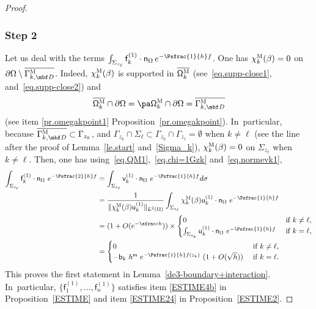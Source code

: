 \begin{proof}
\subsubsection*{Step 2} Let us deal with the terms $ \int_{\Sigma_{z_\ell}} \mathsf f_k^{(1)} \cdot \mathsf n_\Omega \, e^{- \Psfrac{1}{h} f} $.
One has
$\chi_k^{\textsc{M}} (\beta)=0$ on $\partial \Omega\setminus \overline{\Gamma_{k,\mbf D}^{ \textsc{M} }}$.
Indeed, $\chi_k^{\textsc{M}} (\beta)$ is supported in $\overline{\mathsf \Omega_k^{\textsc{M}}}$ (see~\eqref{eq.supp-close1}, and~\eqref{eq.supp-close2}) and
\[
\overline{ \mathsf \Omega_k^{\textsc{M}}}\cap \partial \Omega = \pa \mathsf \Omega_k^{\textsc{M}}\cap \partial \Omega= \overline{\Gamma_{k,\mbf D}^{\textsc{M}}}
\]
(see item \eqref{pr.omegakpoint1} Proposition~\ref{pr.omegakpoint}). In~particular, because $\overline{\Gamma_{k,\mbf D}^{\textsc{M}} }\subset \Gamma_{z_k}$, and $\Gamma_{z_k}\cap \Sigma_\ell \subset \Gamma_{z_k}\cap \Gamma_{z_\ell}=\emptyset$ when $k\neq \ell$ (see the line after the proof of Lemma~\ref{le.start} and~\eqref{Sigma_k}), $\chi_k^{\textsc{M}} (\beta)=0$ on $\Sigma_{z_\ell}$ when $k\neq \ell$.
Then, one has using~\eqref{eq.QM1},~\eqref{eq.chi=1Gzk} and~\eqref{eq.normevk1},
\begin{align*}
\int_{\Sigma_{z_\ell}} \mathsf f_k^{(1)} \cdot \mathsf n_\Omega \ e^{-\Psfrac{2}{h} f} &= \int_{\Sigma_{z_\ell}} \mathsf v_k^{(1)} \cdot \mathsf n_\Omega \ e^{- \Psfrac{1}{h} f} d\sigma\\
&= \frac{ 1}{\Vert \chi_k^{\textsc{M}} (\beta)\mathsf u_k^{(1)}\Vert _{ L^2 (\Omega) }} \int_{\Sigma_{z_\ell}} \chi_k^{\textsc{M}} (\beta) \mathsf u_k^{(1)} \cdot \mathsf n_\Omega \ e^{- \Psfrac{1}{h} f} \\
&=(1+O(e^{-\sfrac ch}))\times
\begin{cases} 0 & \text{ if } k\neq \ell,\\
\int_{\Sigma_{z_k}} \mathsf u_k^{(1)} \cdot \mathsf n_\Omega \ e^{- \Psfrac{1}{h} f} & \text{ if } k=\ell,
\end{cases} \\
&= \begin{cases} 0 & \text{ if } k\neq \ell,\\
-\mathsf b_k \ h^{\mathsf m } \ e^{-\Psfrac{1}{h} f(z_k)} \ (1 + O(\sqrt h)) & \text{ if } k=\ell.
\end{cases}
\end{align*}
This proves the first statement in Lemma~\ref{de3-boundary+interaction}. In~particular, $\{\mathsf f_1^{(1)}, \ldots, \mathsf f_n^{(1)}\} $ satisfies item \eqref{ESTIME4b} in Proposition~\ref{ESTIME} and item \eqref{ESTIME24} in Proposition~\ref{ESTIME2}.


\end{proof}
